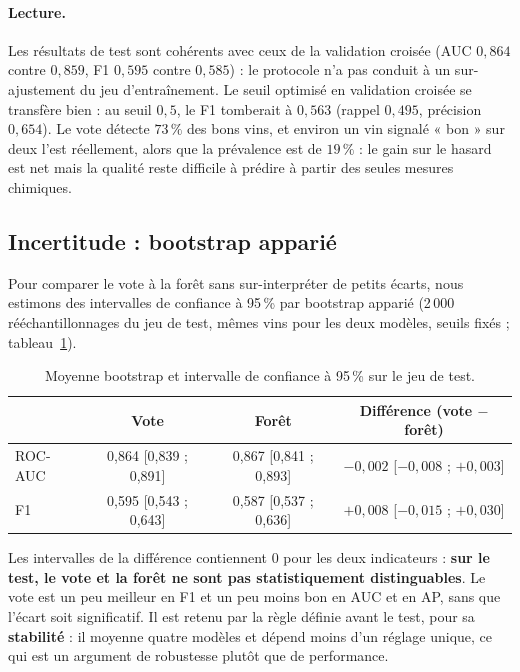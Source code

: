 \documentclass[11pt,a4paper]{article}
\begin{document}
\paragraph{Lecture.}
Les résultats de test sont cohérents avec ceux de la validation croisée (AUC $0{,}864$ contre $0{,}859$, F1 $0{,}595$ contre $0{,}585$) : le protocole n'a pas conduit à un sur-ajustement du jeu d'entraînement.
Le seuil optimisé en validation croisée se transfère bien : au seuil $0{,}5$, le F1 tomberait à $0{,}563$ (rappel $0{,}495$, précision $0{,}654$). Le vote détecte $73\,\%$ des bons vins, et environ un vin signalé « bon » sur deux l'est réellement,
alors que la prévalence est de $19\,\%$ : le gain sur le hasard est net mais la qualité reste difficile à prédire à partir des seules mesures chimiques.

\subsection{Incertitude : bootstrap apparié}

Pour comparer le vote à la forêt sans sur-interpréter de petits écarts, nous estimons des intervalles de confiance à 95\,\% par bootstrap apparié (2\,000 rééchantillonnages du jeu de test, mêmes vins pour les deux modèles, seuils fixés ; tableau~\ref{tab:boot}).

\begin{table}[htbp]
\centering\small
\caption{Moyenne bootstrap et intervalle de confiance à 95\,\% sur le jeu de test.}\label{tab:boot}
\begin{tabular}{@{}lccc@{}}
\toprule
 & Vote & Forêt & Différence (vote $-$ forêt) \\
\midrule
ROC-AUC & 0,864 [0,839 ; 0,891] & 0,867 [0,841 ; 0,893] & $-0{,}002$ [$-0{,}008$ ; $+0{,}003$] \\
F1      & 0,595 [0,543 ; 0,643] & 0,587 [0,537 ; 0,636] & $+0{,}008$ [$-0{,}015$ ; $+0{,}030$] \\
\bottomrule
\end{tabular}
\end{table}

Les intervalles de la différence contiennent 0 pour les deux indicateurs : \textbf{sur le test, le vote et la forêt ne sont pas statistiquement distinguables}. Le vote est un peu meilleur en F1 et un peu moins bon en AUC et en AP, sans que l'écart soit significatif.
Il est retenu par la règle définie avant le test, pour sa \textbf{stabilité} : il moyenne quatre modèles et dépend moins d'un réglage unique, ce qui est un argument de robustesse plutôt que de performance.
\end{document}
